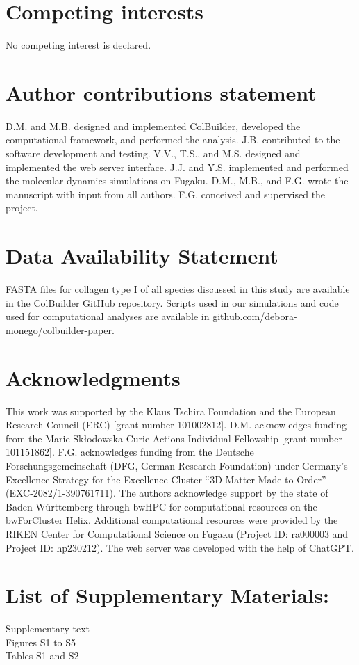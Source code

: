 \documentclass[10pt,letterpaper]{article}
\begin{document}
\section*{Competing interests}
No competing interest is declared.

\section*{Author contributions statement}

D.M. and M.B. designed and implemented ColBuilder, developed the computational framework, and performed the analysis. J.B. contributed to the software development and testing. V.V., T.S., and M.S. designed and implemented the web server interface. J.J. and Y.S. implemented and performed the molecular dynamics simulations on Fugaku. D.M., M.B., and F.G. wrote the manuscript with input from all authors. F.G. conceived and supervised the project.

\section*{Data Availability Statement}
FASTA files for collagen type I of all species discussed in this study are available in the ColBuilder GitHub repository. Scripts used in our simulations and code used for computational analyses are available in \href{https://github.com/debora-monego/colbuilder-paper}{github.com/debora-monego/colbuilder-paper}.

\section*{Acknowledgments}
This work was supported by the Klaus Tschira Foundation and the European Research Council (ERC) [grant number 101002812]. D.M. acknowledges funding from the Marie Skłodowska-Curie Actions Individual Fellowship [grant number 101151862]. F.G. acknowledges funding from the Deutsche Forschungsgemeinschaft (DFG, German Research Foundation) under Germany’s Excellence Strategy for the Excellence Cluster “3D Matter Made to Order” (EXC-2082/1-390761711). The authors acknowledge support by the state of Baden-Württemberg through bwHPC for computational resources on the bwForCluster Helix. Additional computational resources were provided by the RIKEN Center for Computational Science on Fugaku (Project ID: ra000003 and Project ID: hp230212). The web server was developed with the help of ChatGPT. 

\section*{List of Supplementary Materials:}
Supplementary text
\\
Figures S1 to S5
\\
Tables S1 and S2



\end{document}
